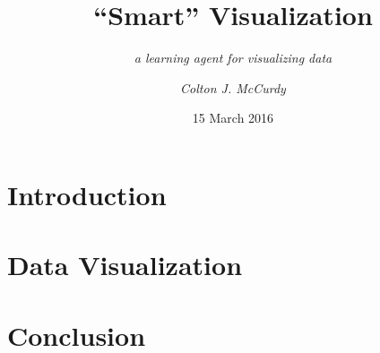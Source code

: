 \documentclass[hyperref={pdfpagemode=FullScreen},xcolor=dvipsnames]{beamer}
\title{``Smart'' Visualization}
\subtitle{\textit{a learning agent for visualizing data}}
\author{\textit{Colton J. McCurdy}}
\date{15 March 2016}
\begin{document}
\kTitleFrame


\section{Introduction}


\section{Data Visualization}


\section{Conclusion}


\end{document}
